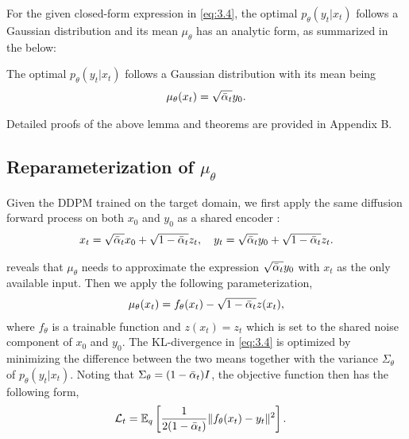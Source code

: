 For the given closed-form expression in \cref{eq:3.4}, the optimal $p_{\theta}(y_t|x_t)$ follows a Gaussian distribution and its mean $\mu_{\theta}$ has an analytic form, as summarized in the  below:


\begin{theorem}\label{theorem:2}
The optimal $p_{\theta}(y_t|x_t)$ follows a Gaussian distribution with its mean being
%
\begin{align}
\mu_{\theta}(x_t) = \sqrt{\bar{\alpha}_{t}}y_0.
\end{align}
\end{theorem}

Detailed proofs of the above lemma and theorems are provided in Appendix B.

\subsection{Reparameterization of $\mu_{\theta}$}\label{subsec:Analytic}

Given the DDPM trained on the target domain, we first apply the same diffusion forward process on both $x_0$ and $y_0$ as a shared encoder :
%
\begin{align}\label{eq:3.6}
x_t=\sqrt{\bar{\alpha}_{t}}x_0+\sqrt{1-\bar{\alpha}_{t}}z_t,\quad y_t=\sqrt{\bar{\alpha}_{t}}y_0+\sqrt{1-\bar{\alpha}_{t}}z_t.
\end{align}

 reveals that $\mu_{\theta}$ needs to approximate the expression $\sqrt{\bar{\alpha}_{t}}y_0$ with $x_t$ as the only available input. Then\sqq{,} we apply the following parameterization,
%
\begin{align}\label{eq:3.5}
\mu_{\theta}(x_t)=f_{\theta}(x_t)-\sqrt{1-\bar{\alpha}_{t}}z(x_t),
\end{align}
%
where $f_{\theta}$ is a trainable function and $z(x_t)=z_t$\sqq{,} which is set to the shared noise component of $x_0$ and $y_0$. %
%
The KL-divergence in \cref{eq:3.4} is optimized by minimizing the difference between the two means together with the variance $\Sigma_{\theta}$ of $p_{\theta}(y_t|x_t)$.
%
Noting that $\Sigma_{\theta}=(1-\bar{\alpha}_{t})I$, the objective function then has the following form,
%
\begin{align}
\mathcal L_t
&=\mathbb E_q\left[\frac{1}{2(1-\bar{\alpha}_{t})}\|f_{\theta}(x_t)-y_t\|^2\right].
\end{align}

